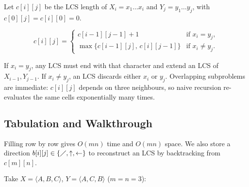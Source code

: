 \begin{center}
\end{center}

Let $c[i][j]$ be the LCS length of $X_i = x_1\ldots x_i$ and $Y_j = y_1\ldots y_j$, with $c[0][j]=c[i][0]=0$.

\[
c[i][j] =
\begin{cases}
c[i-1][j-1]+1 & \text{if } x_i = y_j,\\[4pt]
\max\{c[i-1][j],\, c[i][j-1]\} & \text{if } x_i \neq y_j.
\end{cases}
\]

If $x_i = y_j$, any LCS must end with that character and extend an LCS of $X_{i-1},Y_{j-1}$. If $x_i\neq y_j$, an LCS discards either $x_i$ or $y_j$. Overlapping subproblems are immediate: $c[i][j]$ depends on three neighbours, so naive recursion re-evaluates the same cells exponentially many times.

\subsection{Tabulation and Walkthrough}

Filling row by row gives $O(mn)$ time and $O(mn)$ space. We also store a direction $b[i][j]\in\{\diagup,\uparrow,\leftarrow\}$ to reconstruct an LCS by backtracking from $c[m][n]$.

Take $X=\langle A,B,C\rangle$, $Y=\langle A,C,B\rangle$ ($m=n=3$):

